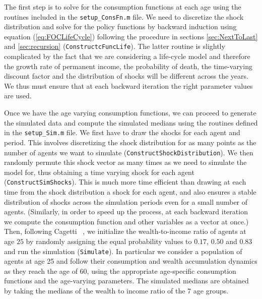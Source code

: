 \documentclass[titlepage, headings=optiontotocandhead]{\econtex}
\begin{document}
The first step is to solve for the consumption functions at each age
using the routines included in the \texttt{setup\_ConsFn.m} file. We
need to discretize the shock distribution and solve for the policy
functions by backward induction using equation (\ref{eq:FOCLifeCycle})
following the procedure in sections \ref{sec:NextToLast} and
\ref{sec:recursion} (\texttt{ConstructcFuncLife}). The latter routine
is slightly complicated by the fact that we are considering a
life-cycle model and therefore the growth rate of permanent income,
the probability of death, the time-varying discount factor and the
distribution of shocks will be different across the years. We thus
must ensure that at each backward iteration the right parameter
values are used.

Once we have the age varying consumption functions, we can proceed to
generate the simulated data and compute the simulated medians using
the routines defined in the \texttt{setup\_Sim.m} file. We first have
to draw the shocks for each agent and period. This involves
discretizing the shock distribution for as many points as the number
of agents we want to simulate
(\texttt{ConstructShockDistribution}). We then randomly permute this
shock vector as many times as we need to simulate the model for, thus
obtaining a time varying shock for each agent
(\texttt{ConstructSimShocks}). This is much more time efficient than
drawing at each time from the shock distribution a shock for each
agent, and also ensures a stable distribution of shocks across the
simulation periods even for a small number of agents. (Similarly, in
order to speed up the process, at each backward iteration we compute
the consumption function and other variables as a vector at once.)
Then, following Cagetti ~\citeyearpar{cagettiWprofiles}, we
initialize the wealth-to-income ratio of agents at age $25$ by
randomly assigning the equal probability values to $0.17$, $0.50$ and
$0.83$ and run the simulation (\texttt{Simulate}). In particular we
consider a population of agents at age 25 and follow their consumption
and wealth accumulation dynamics as they reach the age of $60$, using
the appropriate age-specific consumption functions and the age-varying
parameters. The simulated medians are obtained by taking the medians
of the wealth to income ratio of the $7$ age groups.
\end{document}
